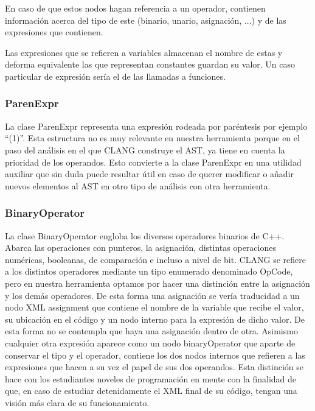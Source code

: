 En caso de que estos nodos hagan referencia a un operador, contienen informaci\'on acerca del tipo de este (binario, unario, asignaci\'on, \etc ...) y de las expresiones que contienen.

Las expresiones que se refieren a variables almacenan el nombre de estas y deforma equivalente las que representan constantes guardan su valor. Un caso particular de expresi\'on ser\'ia el de las llamadas a funciones.

\subsubsection*{ParenExpr}

La clase ParenExpr representa una expresi\'on rodeada por par\'entesis por ejemplo ``(1)''. Esta estructura no es muy relevante en nuestra herramienta porque en el paso del an\'alisis en el que CLANG construye el AST, ya tiene en cuenta la prioridad de los operandos. Esto convierte a la clase ParenExpr en una utilidad auxiliar que sin duda puede resultar \'util en caso de querer modificar o a\~nadir nuevos elementos al AST en otro tipo de an\'alisis con otra herramienta.

\subsubsection*{BinaryOperator}

La clase BinaryOperator engloba los diversos operadores binarios de C++. Abarca las operaciones con punteros, la asignaci\'on, distintas operaciones num\'ericas, booleanas, de comparaci\'on e incluso a nivel de bit. CLANG se refiere a los distintos operadores mediante un tipo enumerado denominado OpCode, pero en nuestra herramienta optamos por hacer una distinci\'on entre la asignaci\'on y los dem\'as operadores. De esta forma una asignaci\'on se ver\'ia traducidad a un nodo XML assignment que contiene el nombre de la variable que recibe el valor, su ubicaci\'on en el c\'odigo y un nodo interno para la expresi\'on de dicho valor. De esta forma no se contempla que haya una asignaci\'on dentro de otra. Asimismo cualquier otra expresi\'on aparece como un nodo binaryOperator que aparte de conservar el tipo y el operador, contiene los dos nodos internos que refieren a las expresiones que hacen a su vez el papel de sus dos operandos. Esta distinci\'on se hace con los estudiantes noveles de programaci\'on en mente con la finalidad de que, en caso de estudiar detenidamente el XML final de su c\'odigo, tengan una visi\'on m\'as clara de su funcionamiento.

